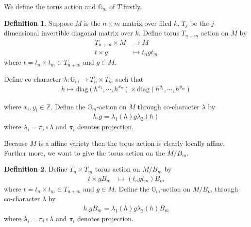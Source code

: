 \documentclass[10pt,UTF8]{article}
\theoremstyle{definition}
\newtheorem{definition}{Definition}[section]
\begin{document}
We define the torus action and $\mathbb{G}_m$ of $T$ firstly.
\begin{definition}
  Suppose $M$ is the $n\times m$ matrix over filed $k$, $T_j$ be the $j$-dimensional invertible diagonal matrix over $k$.
  Define torus $T_{n+ m}$ action on $M$ by 
  \begin{align*}
    T_{n+ m} \times M &\to M\\
    t\times g &\mapsto t_ngt_m
  \end{align*}
  where $t=t_n\times t_m\in T_{n+m}$ and $g\in M$.
  
  Define co-character $\lambda: \mathbb{G}_m \to T_n\times T_m$ such that 
\begin{align*}
  h \mapsto \text{diag}(h^{x_1},\cdots,h^{x_n}) \times \text{diag}(h^{y_1},\cdots,h^{y_m})
\end{align*}

where $x_i,y_i\in \mathbb{Z}$. Define the $\mathbb{G}_m$-action on $M$ through co-character $\lambda$ by
\begin{align*}
  h.g = \lambda_1(h)g\lambda_2(h)
\end{align*}
where $\lambda_i = \pi_i\circ\lambda$ and $\pi_i$ denotes projection.
\end{definition}

Because $M$ is a affine variety then the torus action is clearly locally affine.
Further more, we want to give the torus action on the $M/B_m$.

\begin{definition}
  Define $T_n\times T_m$ torus action on $M/B_m$ by
  \begin{align*}
    t \times gB_m &\mapsto (t_ngt_m)B_m
  \end{align*}
  where $t=t_n\times t_m\in T_{n+m}$ and $g\in M$.
  Define the $\mathbb{G}_m$-action on $M/B_m$ through co-character $\lambda$ by
  \begin{align*}
    h.gB_m = \lambda_1(h)g\lambda_2(h) B_m
  \end{align*}
  where $\lambda_i = \pi_i\circ\lambda$ and $\pi_i$ denotes projection.
\end{definition}
\end{document}

